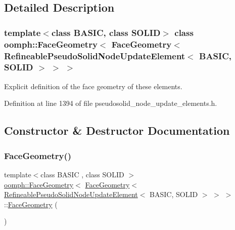 \subsection{Detailed Description}
\subsubsection*{template$<$class B\+A\+S\+IC, class S\+O\+L\+ID$>$\newline
class oomph\+::\+Face\+Geometry$<$ Face\+Geometry$<$ Refineable\+Pseudo\+Solid\+Node\+Update\+Element$<$ B\+A\+S\+I\+C, S\+O\+L\+I\+D $>$ $>$ $>$}

Explicit definition of the face geometry of these elements. 

Definition at line 1394 of file pseudosolid\+\_\+node\+\_\+update\+\_\+elements.\+h.



\subsection{Constructor \& Destructor Documentation}
\mbox{\label{classoomph_1_1FaceGeometry_3_01FaceGeometry_3_01RefineablePseudoSolidNodeUpdateElement_3_01BASIC_00_01SOLID_01_4_01_4_01_4_adc2b1a8073ce32b62d259c1e032c19d9}} 
\subsubsection{\texorpdfstring{Face\+Geometry()}{FaceGeometry()}}
{\footnotesize\ttfamily template$<$class B\+A\+S\+IC , class S\+O\+L\+ID $>$ \\
\hyperlink{classoomph_1_1FaceGeometry}{oomph\+::\+Face\+Geometry}$<$ \hyperlink{classoomph_1_1FaceGeometry}{Face\+Geometry}$<$ \hyperlink{classoomph_1_1RefineablePseudoSolidNodeUpdateElement}{Refineable\+Pseudo\+Solid\+Node\+Update\+Element}$<$ B\+A\+S\+IC, S\+O\+L\+ID $>$ $>$ $>$\+::\hyperlink{classoomph_1_1FaceGeometry}{Face\+Geometry} (\begin{DoxyParamCaption}{ }\end{DoxyParamCaption})\hspace{0.3cm}{\ttfamily [inline]}}




